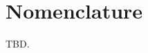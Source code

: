 %
%
%
%
%
%
%
%
%
%
%
%
%
%
%
%
%
%
%
%
%
%
%
%
%
%
%
%
%
%
%
%
%
%
%
%
%
%
%
%
%
%
%
%
\section{Nomenclature}
\label{cldd0:snom0}

TBD.



